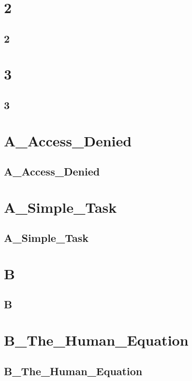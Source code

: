 \section{2}
\subsection{2}
\raggedbottom
\hrulefill

\section{3}
\subsection{3}
\raggedbottom
\hrulefill

\section{A_Access_Denied}
\subsection{A_Access_Denied}
\raggedbottom
\hrulefill

\section{A_Simple_Task}
\subsection{A_Simple_Task}
\raggedbottom
\hrulefill

\section{B}
\subsection{B}
\raggedbottom
\hrulefill

\section{B_The_Human_Equation}
\subsection{B_The_Human_Equation}
\raggedbottom
\hrulefill

